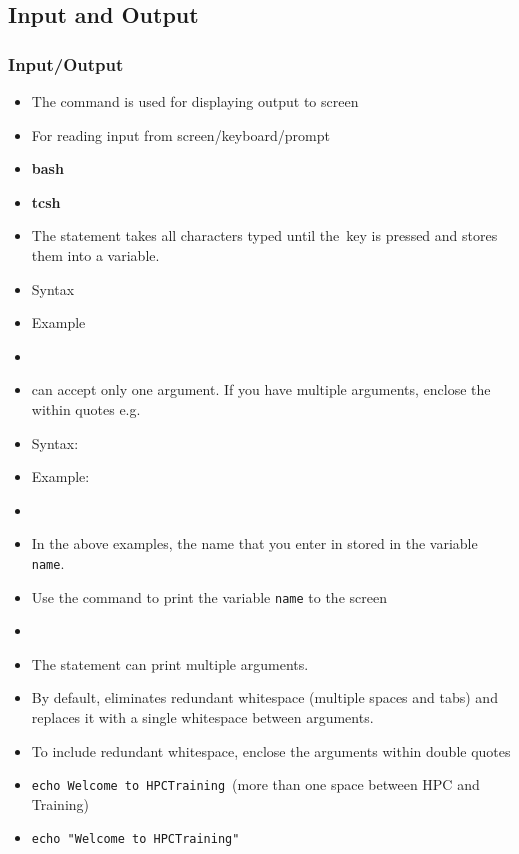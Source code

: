 \documentclass[10pt,t]{beamer}
\begin{document}
\subsection{Input and Output}
\begin{frame}
  \frametitle{Input/Output}
  \begin{itemize}
    \item The command  is used for displaying output to screen 
    \item For reading input from screen/keyboard/prompt
    \item[]\textbf{bash} 
    \item[]\textbf{tcsh} \Verblubrown{\$<}
    \item The  statement takes all characters typed until the \Enter \,key is pressed and stores them into a variable.
    \item[]Syntax 
    \item[]Example 
    \item[] 
    \item \Verblubrown{\$<} can accept only one argument. If you have multiple arguments, enclose the \Verblubrown{\$<} within quotes e.g. 
    \item[]Syntax: 
    \item[]Example: 
    \item[] 
    \item In the above examples, the name that you enter in stored in the variable \texttt{name}.
    \item Use the  command to print the variable \texttt{name} to the screen
    \item[] 
    \item The  statement can print multiple arguments. 
    \item By default,  eliminates redundant whitespace (multiple spaces and tabs) and replaces it with a single whitespace between arguments. 
    \item To include redundant whitespace, enclose the arguments within double quotes
    \item[] \texttt{echo Welcome to HPC\quad\quad Training}\enter\, (more than one space between HPC and Training)
    \item[] \texttt{echo "Welcome to HPC\quad\quad Training"}\enter

\end{itemize}
\end{frame}
\end{document}
